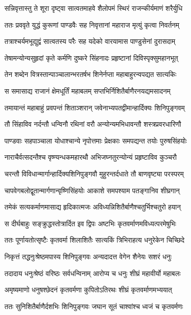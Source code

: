 \twolineshloka
{सन्निवृत्तास्तु ते शूरा दृष्ट्वा सात्वतमाहवे}
{शैलोपमं स्थिरं राजन्कीर्यमाणं शरैर्युधि}


\twolineshloka
{ततः प्रववृते युद्धं कुरूणां पाण्डवैः सह}
{निवृत्तानां महाराज मृत्युं कृत्वा निवर्तनम्}


\twolineshloka
{तत्राश्चर्यमभूद्युद्वं सात्वतस्य परैः सह}
{यदेको वारयामास पाण्डुसेनां दुरासदाम्}


\twolineshloka
{तेषामन्योन्यसुहृदां कृते कर्मणि दुष्करे}
{सिंहनादः प्रहृष्टानां दिविस्पृक्सुमहानभूत्}


\twolineshloka
{तेन शब्देन वित्रस्तान्पाञ्चालान्भरतर्षभ}
{शिनेर्नप्ता महाबाहुरन्वपद्यत सात्यकिः}


\twolineshloka
{स समासाद्य राजानं क्षेमधूर्तिं महाबलम्}
{सप्तभिर्निशितैर्बाणैरनयद्यमसादनम्}


\twolineshloka
{तमायान्तं महाबाहुं प्रवपन्तं शिताञ्शरान्}
{जवेनाभ्यपतद्वीमान्हार्दिक्यः शिनिपुङ्गवम्}


\twolineshloka
{तौ सिंहाविव नर्दन्तौ धन्विनौ रथिनां वरौ}
{अन्योन्यमभिधावन्तौ शस्त्रप्रवरधारिणौ}


\twolineshloka
{पाण्डवाः सहपाञ्चाला योधाश्चान्ये नृपोत्तमाः}
{प्रेक्षकाः समपद्यन्त तयोः पुरुषसिंहयोः}


\twolineshloka
{नाराचैर्वत्सदन्तैश्च वृष्ण्यन्धकमहारथौ}
{अभिजघ्नतुरन्योन्यं प्रहृष्टाविव कुञ्चरौ}


\twolineshloka
{चरन्तौ विविधान्मार्गान्हार्दिक्यशिनिपुङ्गवौ}
{मुहुरन्तर्दधाते तौ बाणवृष्ट्या परस्परम्}


\twolineshloka
{चापवेगबलोद्वूतान्मार्गणान्वृष्णिसिंहयोः}
{आकाशे समपश्याम पतङ्गानिव शीघ्रगान्}


\twolineshloka
{तमेकं सत्यकर्माणमासाद्य हृदिकात्मजः}
{अविध्यन्निशितैर्बाणैश्चतुर्भिश्चतुरो हयान्}


\twolineshloka
{स दीर्घबाहुः सङ्क्रुद्धस्तोत्रार्दित इव द्विपः}
{अष्टभिः कृतवर्माणमविध्यत्परमेषुभिः}


\twolineshloka
{ततः पूर्णायतोत्सृष्टैः कृतवर्मा शिलाशितैः}
{सात्यकिं त्रिभिराहत्य धनुरेकेन चिच्छिदे}


\twolineshloka
{निकृत्तं तद्धनुःश्रेष्ठमपास्य शिनिपुङ्गवः}
{अन्यदादत्त वेगेन शैनेयः सशरं धनुः}


\twolineshloka
{तदादाय धनुःश्रेष्ठं वरिष्ठः सर्वधन्विनाम्}
{आरोप्य च धनुः शीघ्रं महावीर्यो महाबलः}


\twolineshloka
{अमृष्यमाणो धनुषश्छेदनं कृतवर्मणा}
{कुपितोऽतिरथः शीघ्रं कृतवर्माणमभ्ययात्}


\twolineshloka
{ततः सुनिशितैर्बाणैर्दशभिः शिनिपुङ्गवः}
{जघान सूतं चाश्वांश्च ध्वजं च कृतवर्मणः}


